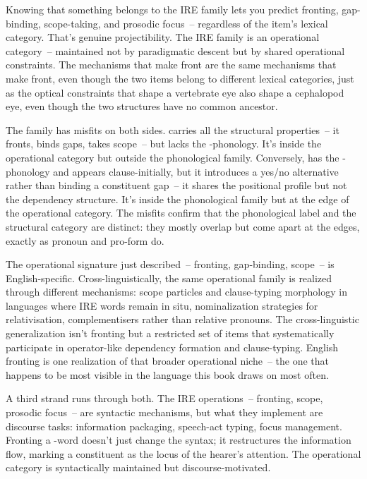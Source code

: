 Knowing that something belongs to the IRE family lets you predict fronting, gap-binding, scope-taking, and prosodic focus~-- regardless of the item's lexical category. That's genuine projectibility. The IRE family is an operational category~-- maintained not by paradigmatic descent but by shared operational constraints. The mechanisms that make  front are the same mechanisms that make  front, even though the two items belong to different lexical categories, just as the optical constraints that shape a vertebrate eye also shape a cephalopod eye, even though the two structures have no common ancestor.

The family has misfits on both sides.  carries all the structural properties~-- it fronts, binds gaps, takes scope~-- but lacks the -phonology. It's inside the operational category but outside the phonological family. Conversely,  has the -phonology and appears clause-initially, but it introduces a yes/no alternative rather than binding a constituent gap~-- it shares the positional profile but not the dependency structure. It's inside the phonological family but at the edge of the operational category. The misfits confirm that the phonological label and the structural category are distinct: they mostly overlap but come apart at the edges, exactly as pronoun and pro-form do.

The operational signature just described~-- fronting, gap-binding, scope~-- is English-specific. Cross-linguistically, the same operational family is realized through different mechanisms: scope particles and clause-typing morphology in languages where IRE words remain in situ, nominalization strategies for relativisation, complementisers rather than relative pronouns. The cross-linguistic generalization isn't fronting but a restricted set of items that systematically participate in operator-like dependency formation and clause-typing. English fronting is one realization of that broader operational niche~-- the one that happens to be most visible in the language this book draws on most often.

A third strand runs through both. The IRE operations~-- fronting, scope, prosodic focus~-- are syntactic mechanisms, but what they implement are discourse tasks: information packaging, speech-act typing, focus management. Fronting a -word doesn't just change the syntax; it restructures the information flow, marking a constituent as the locus of the hearer's attention. The operational category is syntactically maintained but discourse-motivated.

